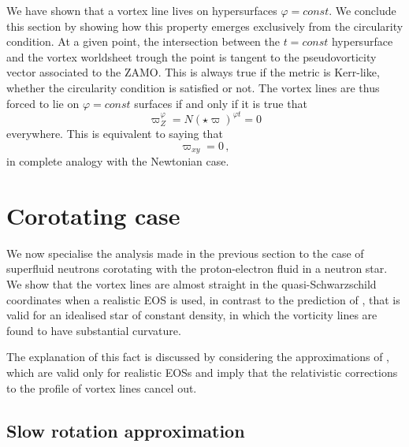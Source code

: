 \documentclass[usenatbib%
]{mnras}
\begin{document}
We have shown that a vortex line lives on hypersurfaces $\varphi=const$. We conclude this section by showing how this property emerges exclusively from the circularity condition. At a given point, the intersection between the $t=const$ hypersurface and the vortex worldsheet trough the point is tangent to the pseudovorticity vector associated to the ZAMO. This is always true if the metric is Kerr-like, whether the circularity condition is satisfied or not. 
The vortex lines are thus  forced to lie on $\varphi =const$ surfaces if and only if  it is true that
\begin{equation}
\varpi_Z^\varphi = N ({\star}\varpi)^{\varphi t} =0 
\end{equation}  
everywhere. This is equivalent to saying that 
\begin{equation}
\varpi_{xy} =0 \, ,
\end{equation}
in complete analogy with the Newtonian case.



\section{Corotating case}\label{corotante}

We now specialise the analysis made in the previous section to the case of superfluid neutrons corotating with the proton-electron fluid in a neutron star.
We show that the vortex lines are almost straight in the quasi-Schwarzschild  coordinates when a realistic EOS is used, in contrast to the prediction of \cite{Rothen1981}, that is valid for an idealised star of constant density, in which the vorticity lines are found to have substantial curvature. 
 
The explanation of this fact is discussed by considering the approximations of \cite{Ravenhall_Pethick1994}, which are valid only for realistic EOSs and imply that the relativistic corrections to the profile of vortex lines cancel out. 


\subsection{Slow rotation approximation}\label{SRAPPX}
\end{document}
